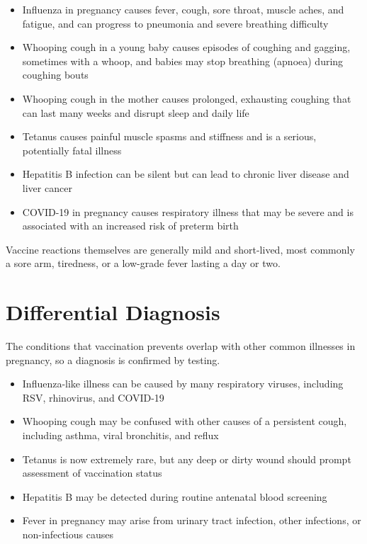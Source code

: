 \begin{itemize}
    \item Influenza in pregnancy causes fever, cough, sore throat, muscle aches, and fatigue, and can progress to pneumonia and severe breathing difficulty
    \item Whooping cough in a young baby causes episodes of coughing and gagging, sometimes with a whoop, and babies may stop breathing (apnoea) during coughing bouts
    \item Whooping cough in the mother causes prolonged, exhausting coughing that can last many weeks and disrupt sleep and daily life
    \item Tetanus causes painful muscle spasms and stiffness and is a serious, potentially fatal illness
    \item Hepatitis B infection can be silent but can lead to chronic liver disease and liver cancer
    \item COVID-19 in pregnancy causes respiratory illness that may be severe and is associated with an increased risk of preterm birth
\end{itemize}

Vaccine reactions themselves are generally mild and short-lived, most commonly a sore arm, tiredness, or a low-grade fever lasting a day or two.

\section*{Differential Diagnosis}
The conditions that vaccination prevents overlap with other common illnesses in pregnancy, so a diagnosis is confirmed by testing.

\begin{itemize}
    \item Influenza-like illness can be caused by many respiratory viruses, including RSV, rhinovirus, and COVID-19
    \item Whooping cough may be confused with other causes of a persistent cough, including asthma, viral bronchitis, and reflux
    \item Tetanus is now extremely rare, but any deep or dirty wound should prompt assessment of vaccination status
    \item Hepatitis B may be detected during routine antenatal blood screening
    \item Fever in pregnancy may arise from urinary tract infection, other infections, or non-infectious causes
\end{itemize}

